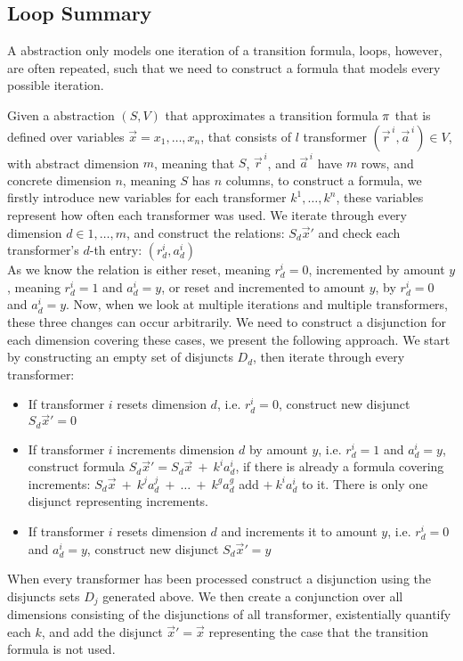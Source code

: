 \subsection{\qvasr Loop Summary}
A \qvasr abstraction only models one iteration of a transition formula, loops, however, are often repeated, such that we need to construct a formula that models every possible iteration. \\ \par
Given a \qvasr abstraction $(S, V)$ that approximates a transition formula $\pi$ that is defined over variables $\vec{x} = x_1, \ldots, x_n$,  that consists of $l$ transformer $(\vec{r}^{\,i}, \vec{a}^{\,i}) \in V$, with abstract dimension $m$, meaning that $S$, $\vec{r}^{\, i}$, and $\vec{a}^{\, i}$ have $m$ rows, and concrete dimension $n$, meaning $S$ has $n$ columns, to construct a formula, we firstly introduce new variables for each transformer $k^1, \ldots, k^n$, these variables represent how often each transformer was used. We iterate through every dimension $d \in 1, \ldots, m$, and construct the relations: $S_d\vec{x}'$ and check each transformer's $d$-th entry: $(r_d^i, a_d^i)$ \\
As we know the relation is either reset, meaning $r_d^i = 0$, incremented by amount $y$, meaning $r_d^i = 1$ and $a_d^i = y$, or reset and incremented to amount $y$, by $r_d^i = 0$ and $a_d^i = y$. Now, when we look at multiple iterations and multiple transformers, these three changes can occur arbitrarily. We need to construct a disjunction for each dimension covering these cases, we present the following approach.
We start by constructing an empty set of disjuncts $D_d$, then iterate through every transformer:
\begin{itemize}
	\item If transformer $i$ resets dimension $d$, i.e. $r_d^i = 0$, construct new disjunct $S_d\vec{x}' = 0$
	\item If transformer $i$ increments dimension $d$ by amount $y$, i.e. $r_d^i = 1$ and $a_d^i = y$, construct formula $S_d\vec{x}' = S_d\vec{x}\ +\ k^ia_d^i$, if there is already a formula covering increments:  $S_d\vec{x}\ +\ k^ja_d^j\ +\ \ldots\ +\ k^ga_d^g$ add $+\ k^ia_d^i$ to it. There is only one disjunct representing increments.
	\item If transformer $i$ resets dimension $d$ and increments it to amount $y$, i.e. $r_d^i = 0$ and $a_d^i = y$, construct new disjunct $S_d\vec{x}' = y$
\end{itemize}
When every transformer has been processed construct a disjunction using the disjuncts sets $D_j$ generated above. We then create a conjunction over all dimensions consisting of the disjunctions of all transformer, existentially quantify each $k$, and add the disjunct $\vec{x}' = \vec{x}$ representing the case that the transition formula is not used.
